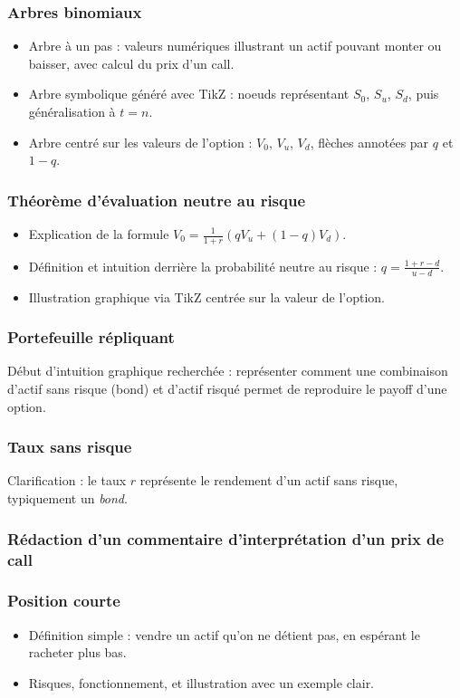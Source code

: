 \documentclass[a4paper,11pt]{article}
\begin{document}
\subsubsection{Arbres binomiaux}
\begin{itemize}
    \item Arbre à un pas : valeurs numériques illustrant un actif pouvant monter ou baisser, avec calcul du prix d’un call.
    \item Arbre symbolique généré avec TikZ : noeuds représentant $S_0$, $S_u$, $S_d$, puis généralisation à $t = n$.
    \item Arbre centré sur les valeurs de l’option : $V_0$, $V_u$, $V_d$, flèches annotées par $q$ et $1-q$.
\end{itemize}

\subsubsection{Théorème d’évaluation neutre au risque}
\begin{itemize}
    \item Explication de la formule $V_0 = \frac{1}{1+r}(q V_u + (1 - q)V_d)$.
    \item Définition et intuition derrière la probabilité neutre au risque : $q = \frac{1 + r - d}{u - d}$.
    \item Illustration graphique via TikZ centrée sur la valeur de l’option.
\end{itemize}

\subsubsection{Portefeuille répliquant}
Début d'intuition graphique recherchée : représenter comment une combinaison d'actif sans risque (bond) et d’actif risqué permet de reproduire le payoff d’une option.

\subsubsection{Taux sans risque}
Clarification : le taux $r$ représente le rendement d’un actif sans risque, typiquement un \textit{bond}.

\subsubsection{Rédaction d’un commentaire d’interprétation d’un prix de call}

\subsubsection{Position courte}
\begin{itemize}
    \item Définition simple : vendre un actif qu’on ne détient pas, en espérant le racheter plus bas.
    \item Risques, fonctionnement, et illustration avec un exemple clair.
\end{itemize}
\end{document}
